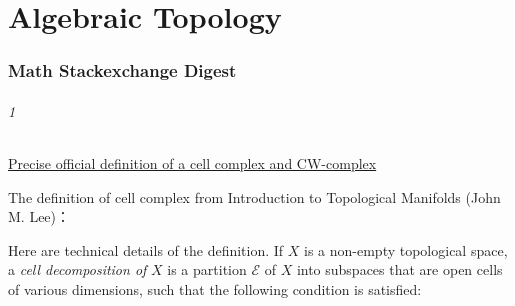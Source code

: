 \part{Algebraic Topology}
\section{Math Stackexchange Digest}
\paragraph{1}\href{https://math.stackexchange.com/questions/42005}{Precise official definition of a cell complex and CW-complex}

The definition of cell complex from Introduction to Topological Manifolds (John M. Lee)：

   Here are technical details of the definition. If $X$ is a non-empty topological space, a {\it cell decomposition of} $X$ is a partition $\mathcal{E}$ of $X$ into subspaces that are open cells of various dimensions, such that the following condition is satisfied:
   
